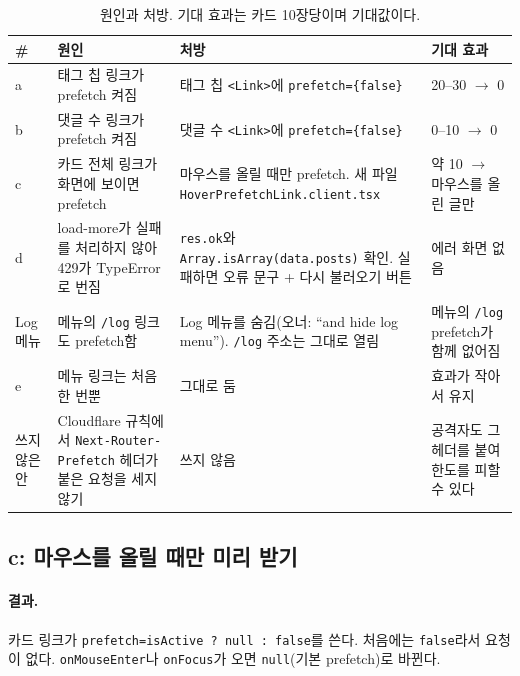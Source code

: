 \begin{table}[H]
  \caption{원인과 처방. 기대 효과는 카드 10장당이며 기대값이다.}
  \label{tab:pf-fix}
  \centering\footnotesize
  \begin{tabularx}{\linewidth}{@{}L{0.8cm}L{3.4cm}Y L{3.0cm}@{}}
    \toprule
    \# & 원인 & 처방 & 기대 효과 \\
    \midrule
    a & 태그 칩 링크가 prefetch 켜짐 & 태그 칩 \texttt{<Link>}에 \texttt{prefetch=\{false\}} & 20--30 $\to$ 0 \\
    \midrule
    b & 댓글 수 링크가 prefetch 켜짐 & 댓글 수 \texttt{<Link>}에 \texttt{prefetch=\{false\}} & 0--10 $\to$ 0 \\
    \midrule
    c & 카드 전체 링크가 화면에 보이면 prefetch & 마우스를 올릴 때만 prefetch. 새 파일 \texttt{HoverPrefetchLink.client.tsx} & 약 10 $\to$ 마우스를 올린 글만 \\
    \midrule
    d & load-more가 실패를 처리하지 않아 429가 TypeError로 번짐 & \texttt{res.ok}와 \texttt{Array.isArray(data.posts)} 확인. 실패하면 오류 문구 + 다시 불러오기 버튼 & 에러 화면 없음 \\
    \midrule
    Log 메뉴 & 메뉴의 \texttt{/log} 링크도 prefetch함 & Log 메뉴를 숨김(오너: ``and hide log menu''). \texttt{/log} 주소는 그대로 열림 & 메뉴의 \texttt{/log} prefetch가 함께 없어짐 \\
    \midrule
    e & 메뉴 링크는 처음 한 번뿐 & 그대로 둠 & 효과가 작아서 유지 \\
    \midrule
    쓰지 않은 안 & Cloudflare 규칙에서 \texttt{Next-Router-Prefetch} 헤더가 붙은 요청을 세지 않기 & 쓰지 않음 & 공격자도 그 헤더를 붙여 한도를 피할 수 있다 \\
    \bottomrule
  \end{tabularx}
\end{table}

\subsection{c: 마우스를 올릴 때만 미리 받기}\label{sec:pf-hover}

\paragraph{결과.}
카드 링크가 \texttt{prefetch={isActive ? null : false}}를 쓴다.
처음에는 \texttt{false}라서 요청이 없다.
\texttt{onMouseEnter}나 \texttt{onFocus}가 오면 \texttt{null}(기본 prefetch)로 바뀐다.


